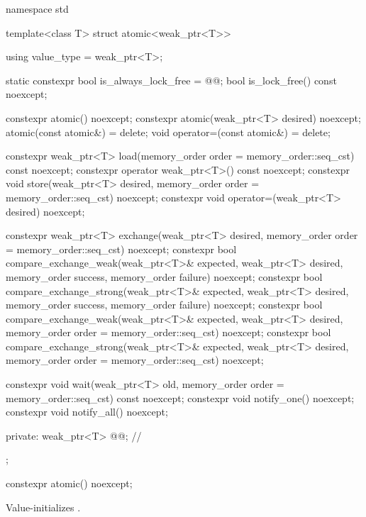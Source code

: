 %
\begin{codeblock}
namespace std {
  template<class T> struct atomic<weak_ptr<T>> {
    using value_type = weak_ptr<T>;

    static constexpr bool is_always_lock_free = @@;
    bool is_lock_free() const noexcept;

    constexpr atomic() noexcept;
    constexpr atomic(weak_ptr<T> desired) noexcept;
    atomic(const atomic&) = delete;
    void operator=(const atomic&) = delete;

    constexpr weak_ptr<T> load(memory_order order = memory_order::seq_cst) const noexcept;
    constexpr operator weak_ptr<T>() const noexcept;
    constexpr void store(weak_ptr<T> desired,
                         memory_order order = memory_order::seq_cst) noexcept;
    constexpr void operator=(weak_ptr<T> desired) noexcept;

    constexpr weak_ptr<T> exchange(weak_ptr<T> desired,
                                   memory_order order = memory_order::seq_cst) noexcept;
    constexpr bool compare_exchange_weak(weak_ptr<T>& expected, weak_ptr<T> desired,
                                         memory_order success, memory_order failure) noexcept;
    constexpr bool compare_exchange_strong(weak_ptr<T>& expected, weak_ptr<T> desired,
                                           memory_order success, memory_order failure) noexcept;
    constexpr bool compare_exchange_weak(weak_ptr<T>& expected, weak_ptr<T> desired,
                                         memory_order order = memory_order::seq_cst) noexcept;
    constexpr bool compare_exchange_strong(weak_ptr<T>& expected, weak_ptr<T> desired,
                                           memory_order order = memory_order::seq_cst) noexcept;

    constexpr void wait(weak_ptr<T> old,
                        memory_order order = memory_order::seq_cst) const noexcept;
    constexpr void notify_one() noexcept;
    constexpr void notify_all() noexcept;

  private:
    weak_ptr<T> @@;              // \expos
  };
}
\end{codeblock}

%
\begin{itemdecl}
constexpr atomic() noexcept;
\end{itemdecl}

\begin{itemdescr}
\pnum
\effects
Value-initializes .
\end{itemdescr}


